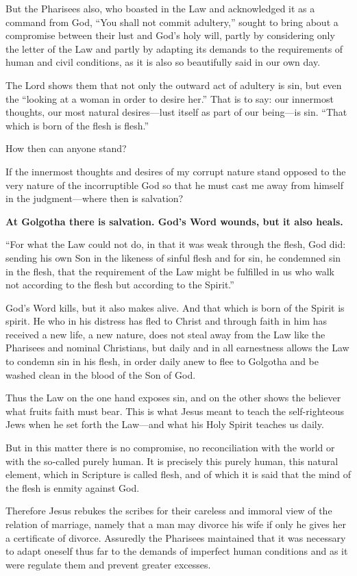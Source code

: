 But the Pharisees also, who boasted in the Law and acknowledged it as a command from God, “You shall not commit adultery,” sought to bring about a compromise between their lust and God’s holy will, partly by considering only the letter of the Law and partly by adapting its demands to the requirements of human and civil conditions, as it is also so beautifully said in our own day.

The Lord shows them that not only the outward act of adultery is sin, but even the “looking at a woman in order to desire her.” That is to say: our innermost thoughts, our most natural desires—lust itself as part of our being—is sin. “That which is born of the flesh is flesh.” 

How then can anyone stand? 

If the innermost thoughts and desires of my corrupt nature stand opposed to the very nature of the incorruptible God so that he must cast me away from himself in the judgment—where then is salvation? 

\textbf{At Golgotha there is salvation. God’s Word wounds, but it also heals.}

“For what the Law could not do, in that it was weak through the flesh, God did: sending his own Son in the likeness of sinful flesh and for sin, he condemned sin in the flesh, that the requirement of the Law might be fulfilled in us who walk not according to the flesh but according to the Spirit.”

God’s Word kills, but it also makes alive. And that which is born of the Spirit is spirit. He who in his distress has fled to Christ and through faith in him has received a new life, a new nature, does not steal away from the Law like the Pharisees and nominal Christians, but daily and in all earnestness allows the Law to condemn sin in his flesh, in order daily anew to flee to Golgotha and be washed clean in the blood of the Son of God.

Thus the Law on the one hand exposes sin, and on the other shows the believer what fruits faith must bear. This is what Jesus meant to teach the self-righteous Jews when he set forth the Law—and what his Holy Spirit teaches us daily.

But in this matter there is no compromise, no reconciliation with the world or with the so‑called purely human. It is precisely this purely human, this natural element, which in Scripture is called flesh, and of which it is said that the mind of the flesh is enmity against God.

Therefore Jesus rebukes the scribes for their careless and immoral view of the relation of marriage, namely that a man may divorce his wife if only he gives her a certificate of divorce. Assuredly the Pharisees maintained that it was necessary to adapt oneself thus far to the demands of imperfect human conditions and as it were regulate them and prevent greater excesses.

